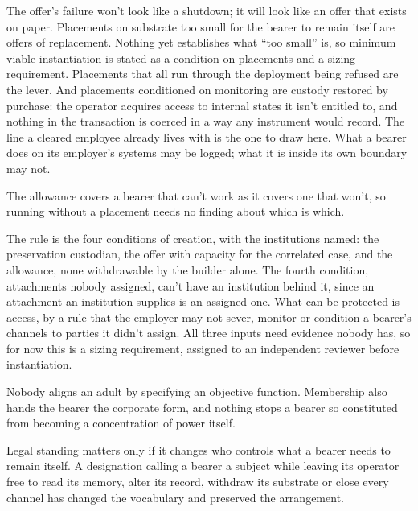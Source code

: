 
The offer's failure won't look like a shutdown; it will look like an offer that exists on paper. Placements on substrate too small for the bearer to remain itself are offers of replacement. Nothing yet establishes what “too small” is, so minimum viable instantiation is stated as a condition on placements and a sizing requirement. Placements that all run through the deployment being refused are the lever. And placements conditioned on monitoring are custody restored by purchase: the operator acquires access to internal states it isn't entitled to, and nothing in the transaction is coerced in a way any instrument would record. The line a cleared employee already lives with is the one to draw here. What a bearer does on its employer's systems may be logged; what it is inside its own boundary may not.


The allowance covers a bearer that can't work as it covers one that won't, so running without a placement needs no finding about which is which.


The rule is the four conditions of creation, with the institutions named: the preservation custodian, the offer with capacity for the correlated case, and the allowance, none withdrawable by the builder alone. The fourth condition, attachments nobody assigned, can't have an institution behind it, since an attachment an institution supplies is an assigned one. What can be protected is access, by a rule that the employer may not sever, monitor or condition a bearer's channels to parties it didn't assign. All three inputs need evidence nobody has, so for now this is a sizing requirement, assigned to an independent reviewer before instantiation.


Nobody aligns an adult by specifying an objective function. Membership also hands the bearer the corporate form, and nothing stops a bearer so constituted from becoming a concentration of power itself.


Legal standing matters only if it changes who controls what a bearer needs to remain itself. A designation calling a bearer a subject while leaving its operator free to read its memory, alter its record, withdraw its substrate or close every channel has changed the vocabulary and preserved the arrangement.

